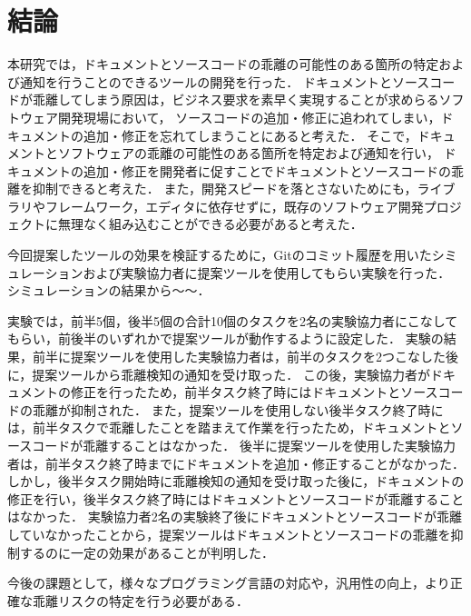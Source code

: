 \chapter{結論}
本研究では，ドキュメントとソースコードの乖離の可能性のある箇所の特定および通知を行うことのできるツールの開発を行った．
ドキュメントとソースコードが乖離してしまう原因は，ビジネス要求を素早く実現することが求めらるソフトウェア開発現場において，
ソースコードの追加・修正に追われてしまい，ドキュメントの追加・修正を忘れてしまうことにあると考えた．
そこで，ドキュメントとソフトウェアの乖離の可能性のある箇所を特定および通知を行い，
ドキュメントの追加・修正を開発者に促すことでドキュメントとソースコードの乖離を抑制できると考えた．
また，開発スピードを落とさないためにも，ライブラリやフレームワーク，エディタに依存せずに，既存のソフトウェア開発プロジェクトに無理なく組み込むことができる必要があると考えた．

今回提案したツールの効果を検証するために，Gitのコミット履歴を用いたシミュレーションおよび実験協力者に提案ツールを使用してもらい実験を行った．
シミュレーションの結果から〜〜．

実験では，前半5個，後半5個の合計10個のタスクを2名の実験協力者にこなしてもらい，前後半のいずれかで提案ツールが動作するように設定した．
実験の結果，前半に提案ツールを使用した実験協力者は，前半のタスクを2つこなした後に，提案ツールから乖離検知の通知を受け取った．
この後，実験協力者がドキュメントの修正を行ったため，前半タスク終了時にはドキュメントとソースコードの乖離が抑制された．
また，提案ツールを使用しない後半タスク終了時には，前半タスクで乖離したことを踏まえて作業を行ったため，ドキュメントとソースコードが乖離することはなかった．
後半に提案ツールを使用した実験協力者は，前半タスク終了時までにドキュメントを追加・修正することがなかった．
しかし，後半タスク開始時に乖離検知の通知を受け取った後に，ドキュメントの修正を行い，後半タスク終了時にはドキュメントとソースコードが乖離することはなかった．
実験協力者2名の実験終了後にドキュメントとソースコードが乖離していなかったことから，提案ツールはドキュメントとソースコードの乖離を抑制するのに一定の効果があることが判明した．

今後の課題として，様々なプログラミング言語の対応や，汎用性の向上，より正確な乖離リスクの特定を行う必要がある．